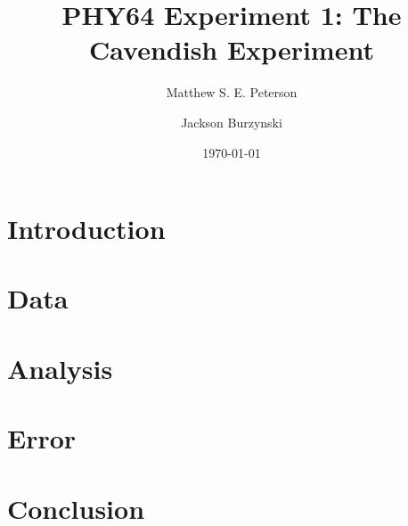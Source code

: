 \documentclass[aps, reprint,amsmath,amssymb]{revtex4-1} %
\begin{document}
\title{PHY64 Experiment 1: The Cavendish Experiment}
\author{Matthew S. E. Peterson}
\author{Jackson Burzynski}
\date{\today} 
\maketitle

\section{Introduction}

\section{Data}

\section{Analysis}

\section{Error}

\section{Conclusion}
\end{document}

